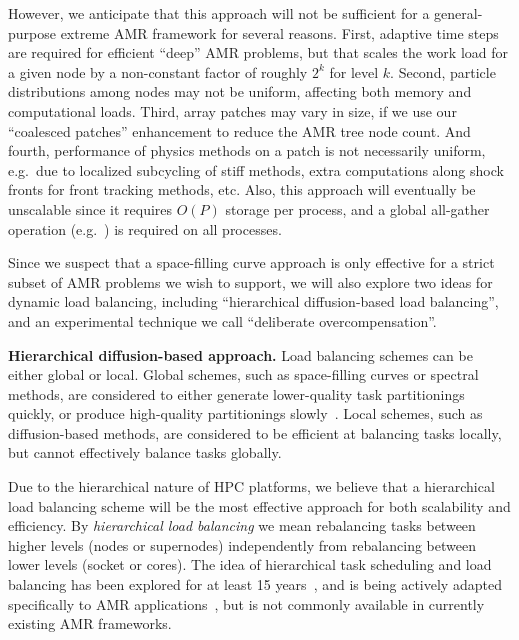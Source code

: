 \documentclass[10pt,twocolumn]{article}
\begin{document}
However, we anticipate that this approach will not be sufficient for a
general-purpose extreme AMR framework for several reasons.
%
First, adaptive time steps are required for efficient ``deep'' AMR
problems, but that scales the work load for a given node by a
non-constant factor of roughly $2^k$ for level $k$.
%
Second, particle distributions among nodes may not be uniform, affecting both memory and computational loads.
%
Third, array patches may vary in size, if we use our ``coalesced
patches'' enhancement to reduce the AMR tree node count.
%
And fourth, performance of physics methods on a patch is not
necessarily uniform, e.g.~due to localized subcycling of stiff
methods, extra computations along shock fronts for front tracking
methods, etc.  
%
Also, this approach will eventually be unscalable since it
requires $O(P)$ storage per process, and a global all-gather
operation (e.g.~) is required on all processes.

Since we suspect that a space-filling curve approach is only effective
for a strict subset of AMR problems we wish to support, we will also
explore two ideas for dynamic load balancing, including ``hierarchical
diffusion-based load balancing'', and an experimental technique we
call ``deliberate overcompensation''.

\textbf{Hierarchical diffusion-based approach.} Load balancing
schemes can be either global or local.  Global schemes, such as
space-filling curves or spectral methods, are considered to either
generate lower-quality task partitionings quickly, or produce
high-quality partitionings slowly~\cite{ScKa97}.  Local schemes,
such as diffusion-based methods, are considered to be efficient
at balancing tasks locally, but cannot effectively balance tasks
globally.

Due to the hierarchical nature of HPC platforms, we believe that a
hierarchical load balancing scheme will be the most effective approach
for both scalability and efficiency.  By \textit{hierarchical load
  balancing} we mean rebalancing tasks between higher levels (nodes or
supernodes) independently from rebalancing between lower levels
(socket or cores).  The idea of hierarchical task scheduling and load
balancing has been explored for at least 15 years~\cite{AhGh94}, and
is being actively adapted specifically to AMR
applications~\cite{LaTa06}, but is not commonly available in currently
existing AMR frameworks.
\end{document}

